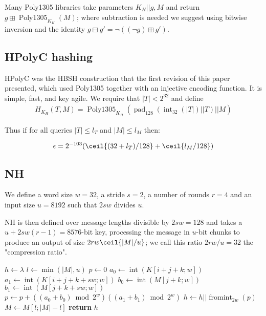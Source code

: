 \documentclass[journal=tosc,preprint,floatrow,submission]{iacrtrans}
\DeclareMathOperator{\Polydjb}{Poly1305}
\DeclareMathOperator{\intify}{int}
\DeclareMathOperator{\fromint}{fromint}
\DeclareMathOperator{\pad}{pad}
\begin{document}
Many Poly1305 libraries
take parameters $K_H || g, M$ and return $g \boxplus \Polydjb_{K_H}(M)$; where subtraction
is needed we suggest using bitwise inversion and the identity
$g \boxminus g' = \neg ((\neg g) \boxplus g')$.

\subsection{HPolyC hashing}
HPolyC was the HBSH construction that the first revision of this paper presented, which used
Poly1305 together with an injective encoding function.
It is simple, fast, and key agile. We require that $|T| < 2^{32}$ and define
\begin{align*}
H_{K_H}(T, M) = \Polydjb_{K_H}(\pad_{128}(\intify_{32}(|T|) || T) || M)
\end{align*}

Thus if for all queries $|T| \leq l_T$ and $|M| \leq l_M$ then:

\begin{displaymath}
\epsilon = 2^{-103}(\ceil{(32 + l_T)/128} + \ceil{l_M/128})
\end{displaymath}

\subsection{NH}\label{nh}

We define a word size $w = 32$, a stride $s = 2$,
a number of rounds $r = 4$ and an input size $u = 8192$ such that $2sw$ divides $u$.

NH is then defined over message
lengths divisible by $2sw = 128$
and takes a $u + 2sw(r -1) = 8576$-bit key, processing the message
in $u$-bit chunks to produce
an output of size $2rw\ceil{|M|/u}$; we call this ratio $2rw/u = 32$ the "compression ratio".

\begin{algorithmic}[0]
    \State $h \gets \lambda$
        \State $l \gets \min{(|M|, u)}$
            \State $p \gets 0$
                    \State $a_0 \gets \intify(K[i+j+k;w])$
                    \State $a_1 \gets \intify(K[i+j+k+sw;w])$
                    \State $b_0 \gets \intify(M[j+k;w])$
                    \State $b_1 \gets \intify(M[j+k+sw;w])$
                    \State $p \gets p + ((a_0 + b_0) \bmod 2^w)((a_1 + b_1) \bmod 2^w)$
                \EndFor
            \EndFor
            \State $h \gets h || \fromint_{2w}(p)$
        \EndFor
        \State $M \gets M[l;|M| - l]$
    \EndWhile
    \State \textbf{return} $h$
    \EndProcedure
\end{algorithmic}
\end{document}
